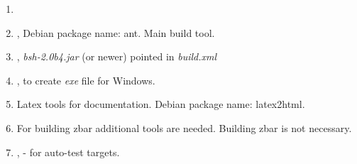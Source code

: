 \documentclass[polish,a4paper,11pt,oneside]{article}
\begin{document}
\begin{enumerate}
\item
  \javajdk
\item
  , Debian package name: ant.
  Main build tool.
\item
  ,
  {\em bsh-2.0b4.jar} (or newer) pointed in {\em build.xml}
\item
  ,
  to create {\em exe} file for Windows.
\item
  Latex tools for documentation. Debian package name: latex2html.
\item
  For building zbar additional tools are needed.
  Building zbar is not necessary.
\item
  ,
  - for auto-test targets.


\end{enumerate}

\end{document}
